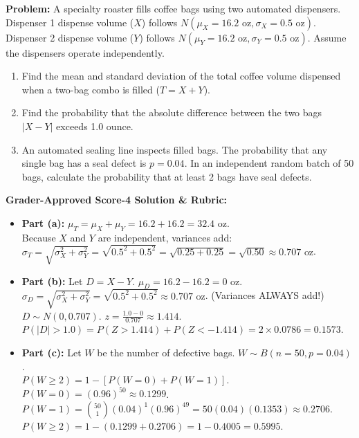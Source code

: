 \begin{frqrubricbox}
\textbf{Problem:} A specialty roaster fills coffee bags using two automated dispensers.
Dispenser 1 dispense volume ($X$) follows $N(\mu_X = 16.2\text{ oz}, \sigma_X = 0.5\text{ oz})$.
Dispenser 2 dispense volume ($Y$) follows $N(\mu_Y = 16.2\text{ oz}, \sigma_Y = 0.5\text{ oz})$.
Assume the dispensers operate independently.
\begin{enumerate}[label=(\alph*)]
  \item Find the mean and standard deviation of the total coffee volume dispensed when a two-bag combo is filled ($T = X + Y$).
  \item Find the probability that the absolute difference between the two bags $|X - Y|$ exceeds 1.0 ounce.
  \item An automated sealing line inspects filled bags. The probability that any single bag has a seal defect is $p = 0.04$. In an independent random batch of 50 bags, calculate the probability that at least 2 bags have seal defects.
\end{enumerate}

\textbf{Grader-Approved Score-4 Solution \& Rubric:}
\begin{itemize}[leftmargin=1.2em]
  \item \textbf{Part (a):} $\mu_T = \mu_X + \mu_Y = 16.2 + 16.2 = 32.4\text{ oz}$.\\
  Because $X$ and $Y$ are independent, variances add:
  $\sigma_T = \sqrt{\sigma_X^2 + \sigma_Y^2} = \sqrt{0.5^2 + 0.5^2} = \sqrt{0.25 + 0.25} = \sqrt{0.50} \approx 0.707\text{ oz}$.
  \item \textbf{Part (b):} Let $D = X - Y$. $\mu_D = 16.2 - 16.2 = 0\text{ oz}$.\\
  $\sigma_D = \sqrt{\sigma_X^2 + \sigma_Y^2} = \sqrt{0.5^2 + 0.5^2} \approx 0.707\text{ oz}$. (Variances ALWAYS add!)\\
  $D \sim N(0, 0.707)$.
  $z = \frac{1.0 - 0}{0.707} \approx 1.414$.\\
  $P(|D| > 1.0) = P(Z > 1.414) + P(Z < -1.414) = 2 \times 0.0786 = \mathbf{0.1573}$.
  \item \textbf{Part (c):} Let $W$ be the number of defective bags. $W \sim B(n = 50, p = 0.04)$.\\
  $P(W \ge 2) = 1 - [P(W = 0) + P(W = 1)]$.\\
  $P(W = 0) = (0.96)^{50} \approx 0.1299$.\\
  $P(W = 1) = \binom{50}{1} (0.04)^1 (0.96)^{49} = 50(0.04)(0.1353) \approx 0.2706$.\\
  $P(W \ge 2) = 1 - (0.1299 + 0.2706) = 1 - 0.4005 = \mathbf{0.5995}$.
\end{itemize}
\end{frqrubricbox}

